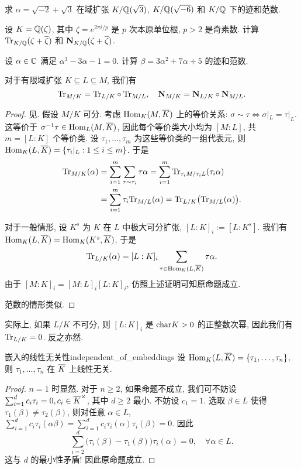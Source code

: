 \begin{exercise}
求 $\alpha=\sqrt{-2}+\sqrt3$ 在域扩张 $K/{\mathbb{Q}}(\sqrt3)$,  $K/{\mathbb{Q}}(\sqrt{-6})$ 和 $K/{\mathbb{Q}}$ 下的迹和范数.
\end{exercise}

\begin{exercise}
设 $K={\mathbb{Q}}(\zeta)$, 其中 $\zeta=e^{2\pi i/p}$ 是 $p$ 次本原单位根, $p>2$ 是奇素数. 计算 ${\mathrm{Tr}}_{K/{\mathbb{Q}}}(\zeta+\overline\zeta)$ 和 ${\mathbf{N}}_{K/{\mathbb{Q}}}(\zeta+\overline\zeta)$.
\end{exercise}

\begin{exercise}
设 $\alpha\in{\mathbb{C}}$ 满足 $\alpha^3-3\alpha-1=0$. 计算 $\beta=3\alpha^2+7\alpha+5$ 的迹和范数.
\end{exercise}

\begin{corollary}{}{}
对于有限域扩张 $K\subseteq L\subseteq M$, 我们有
	\[{\mathrm{Tr}}_{M/K}={\mathrm{Tr}}_{L/K}\circ {\mathrm{Tr}}_{M/L},\quad {\mathbf{N}}_{M/K}={\mathbf{N}}_{L/K}\circ {\mathbf{N}}_{M/L}.\]
\end{corollary}
\begin{proof}
见\cite[Chapter II, \S 10]{ZariskiSamuel1958}.
假设 $M/K$ 可分. 考虑 ${\mathrm{Hom}}_K(M,\overline K)$ 上的等价关系: $\sigma\sim\tau\iff \sigma|_L=\tau|_L$. 这等价于 $\sigma^{-1}\tau\in{\mathrm{Hom}}_L(M,\overline K)$, 因此每个等价类大小均为 $[M:L]$, 共 $m=[L:K]$ 个等价类. 设 $\tau_1,\dots,\tau_m$ 为这些等价类的一组代表元, 则 ${\mathrm{Hom}}_K(L,\overline K)=\left\{\tau_i|_L:1\le i\le m\right\}$. 于是
	\[\begin{split}
		{\mathrm{Tr}}_{M/K}(\alpha)&=\sum_{i=1}^m\sum_{\tau\sim\tau_i} \tau\alpha
			=\sum_{i=1}^m{\mathrm{Tr}}_{\tau_i M/\tau_i L}(\tau_i \alpha)\\
		&=\sum_{i=1}^m\tau_i{\mathrm{Tr}}_{M/L}(\alpha)
			={\mathrm{Tr}}_{L/K}\bigl({\mathrm{Tr}}_{M/L}(\alpha)\bigr).
	\end{split}\]

对于一般情形, 设 $K^s$ 为 $K$ 在 $L$ 中极大可分扩张, $[L:K]_i:=[L:K^s]$. 我们有 ${\mathrm{Hom}}_{K}(L,\overline K)={\mathrm{Hom}}_K(K^s,\overline K)$, 于是
	\[{\mathrm{Tr}}_{L/K}(\alpha)=[L:K]_i\sum_{\tau\in{\mathrm{Hom}}_K(L,\overline K)}\tau\alpha.\]
由于 $[M:K]_i=[M:L]_i[L:K]_i$, 仿照上述证明可知原命题成立.

范数的情形类似.
\end{proof}
\begin{remark}
实际上, 如果 $L/K$ 不可分, 则 $[L:K]_i$ 是 ${\mathrm{char}} K>0$ 的正整数次幂, 因此我们有 ${\mathrm{Tr}}_{L/K}=0$.
反之亦然.
\end{remark}

\begin{proposition}{嵌入的线性无关性}{independent_of_embeddings}
设 ${\mathrm{Hom}}_K(L,\overline K)=\left\{\tau_1,\dots,\tau_n\right\}$, 则 $\tau_1,\dots,\tau_n$ 在 $\overline K$ 上线性无关.
\end{proposition}
\begin{proof}
$n=1$ 时显然. 对于 $n\ge2$, 如果命题不成立, 我们可不妨设 $\sum_{i=1}^d c_i\tau_i=0,c_i\in\overline K^\times$, 其中 $d\ge 2$ 最小. 不妨设 $c_1=1$. 选取 $\beta\in L$ 使得 $\tau_1(\beta)\neq\tau_2(\beta)$, 则对任意 $\alpha\in L$, $\sum_{i=1}^d c_i\tau_i(\alpha\beta)=\sum_{i=1}^d c_i\tau_i(\alpha)\tau_i(\beta)=0$. 因此
	\[\sum_{i=2}^d\bigl(\tau_i(\beta)-\tau_1(\beta)\bigr)\tau_i(\alpha)=0,\quad\forall \alpha\in L.\]
这与 $d$ 的最小性矛盾! 因此原命题成立.
\end{proof}


